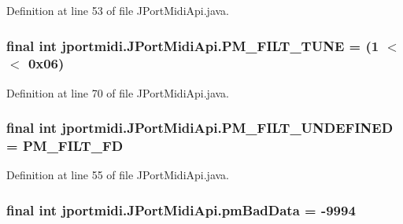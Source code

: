 Definition at line 53 of file J\+Port\+Midi\+Api.\+java.

\subsubsection[{\texorpdfstring{P\+M\+\_\+\+F\+I\+L\+T\+\_\+\+T\+U\+NE}{PM_FILT_TUNE}}]{\setlength{\rightskip}{0pt plus 5cm}final {\bf int} jportmidi.\+J\+Port\+Midi\+Api.\+P\+M\+\_\+\+F\+I\+L\+T\+\_\+\+T\+U\+NE = (1 $<$$<$ 0x06)\hspace{0.3cm}{\ttfamily [static]}}\hypertarget{classjportmidi_1_1_j_port_midi_api_a3918de1cdc8c20a370eadd5c0fec51d1}{}\label{classjportmidi_1_1_j_port_midi_api_a3918de1cdc8c20a370eadd5c0fec51d1}


Definition at line 70 of file J\+Port\+Midi\+Api.\+java.

\subsubsection[{\texorpdfstring{P\+M\+\_\+\+F\+I\+L\+T\+\_\+\+U\+N\+D\+E\+F\+I\+N\+ED}{PM_FILT_UNDEFINED}}]{\setlength{\rightskip}{0pt plus 5cm}final {\bf int} jportmidi.\+J\+Port\+Midi\+Api.\+P\+M\+\_\+\+F\+I\+L\+T\+\_\+\+U\+N\+D\+E\+F\+I\+N\+ED = {\bf P\+M\+\_\+\+F\+I\+L\+T\+\_\+\+FD}\hspace{0.3cm}{\ttfamily [static]}}\hypertarget{classjportmidi_1_1_j_port_midi_api_aeed1df9b880f96c4df4daae1be6f678b}{}\label{classjportmidi_1_1_j_port_midi_api_aeed1df9b880f96c4df4daae1be6f678b}


Definition at line 55 of file J\+Port\+Midi\+Api.\+java.

\subsubsection[{\texorpdfstring{pm\+Bad\+Data}{pmBadData}}]{\setlength{\rightskip}{0pt plus 5cm}final {\bf int} jportmidi.\+J\+Port\+Midi\+Api.\+pm\+Bad\+Data = -\/9994}\hypertarget{classjportmidi_1_1_j_port_midi_api_a4e012bca63ec8bea8e3d18f09e44d606}{}\label{classjportmidi_1_1_j_port_midi_api_a4e012bca63ec8bea8e3d18f09e44d606}


